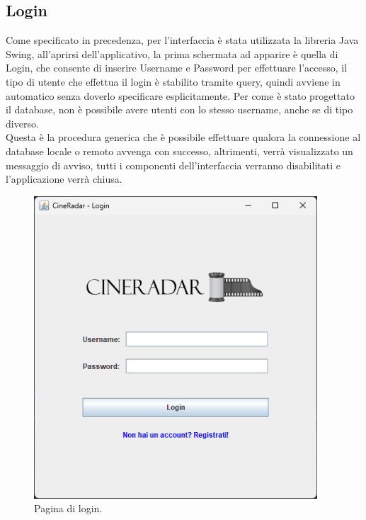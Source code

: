 \documentclass[a4paper,12pt]{report}
\begin{document}
\subsection{Login}
Come specificato in precedenza, per l'interfaccia è stata utilizzata la libreria Java Swing, all'aprirsi dell'applicativo, la prima schermata ad apparire è quella di Login, che consente di inserire Username e Password per effettuare l'accesso, il tipo di utente che effettua il login è stabilito tramite query, quindi avviene in automatico senza doverlo specificare esplicitamente. Per come è stato progettato il database, non è possibile avere utenti con lo stesso username, anche se di tipo diverso.\\
Questa è la procedura generica che è possibile effettuare qualora la connessione al database locale o remoto avvenga con successo, altrimenti, verrà visualizzato un messaggio di avviso, tutti i componenti dell'interfaccia verranno disabilitati e l'applicazione verrà chiusa.
\begin{figure}[H]
	\centering
	\includegraphics[width=300pt]{appimg/loginjw.png}
	\caption{Pagina di login.}
\end{figure}
\end{document}
